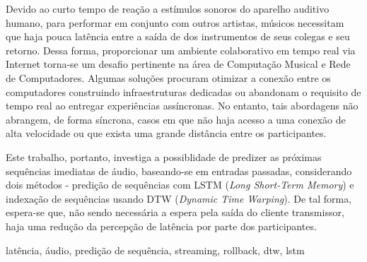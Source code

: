 \resumo
{}

Devido ao curto tempo de reação a estímulos sonoros do aparelho auditivo humano, para performar em conjunto com outros artistas, músicos necessitam que haja pouca latência entre a saída de dos instrumentos de seus colegas e seu retorno. Dessa forma, proporcionar um ambiente colaborativo em tempo real via Internet torna-se um desafio pertinente na área de Computação Musical e Rede de Computadores. Algumas soluções procuram otimizar a conexão entre os computadores construindo infraestruturas dedicadas ou abandonam o requisito de tempo real ao entregar experiências assíncronas. No entanto, tais abordagens não abrangem, de forma síncrona, casos em que não haja acesso a uma conexão de alta velocidade ou que exista uma grande distância entre os participantes.

Este trabalho, portanto, investiga a possiblidade de predizer as próximas sequências imediatas de áudio, baseando-se em entradas passadas, considerando dois métodos - predição de sequências com LSTM (\textit{Long Short-Term Memory})\cite{lstm} e indexação de sequências usando DTW (\textit{Dynamic Time Warping})\cite{dtw}. De tal forma, espera-se que, não sendo necessária a espera pela saída do cliente transmissor, haja uma redução da percepção de latência por parte dos participantes.

\begin{keywords}
latência, áudio, predição de sequência, streaming, rollback, dtw, lstm
\end{keywords}
